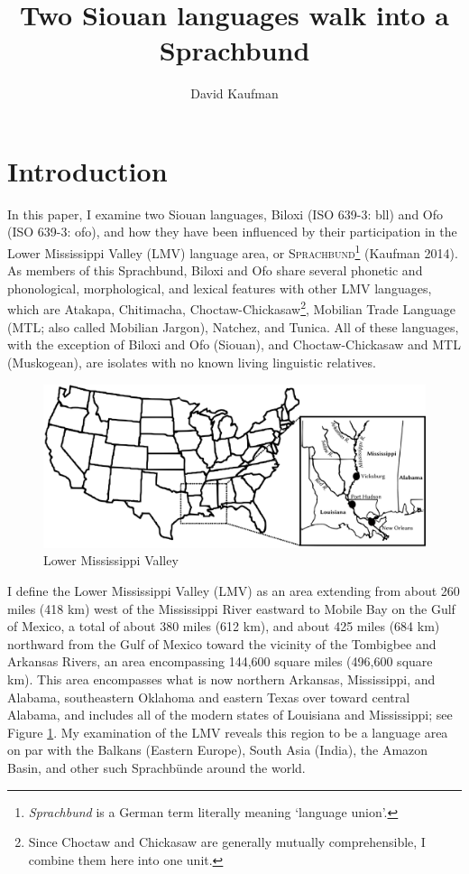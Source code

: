 \documentclass[output=paper]{LSP/langsci}
\author{David Kaufman}
\title{Two Siouan languages walk into a Sprachbund}
\begin{document}
\section{Introduction}
In this paper, I examine two Siouan languages, Biloxi (ISO 639-3: bll) and Ofo (ISO 639-3: ofo), and how they have been influenced by their participation in the Lower Mississippi Valley (LMV) language area, or \textsc{Sprachbund}\footnote{\emph{Sprachbund} is a German term literally meaning `language union'.} (Kaufman 2014). As members of this Sprachbund, Biloxi and Ofo share several phonetic and phonological, morphological, and lexical features with other LMV languages, which are Atakapa, Chitimacha, Choctaw-Chickasaw\footnote{Since Choctaw and Chickasaw are generally mutually comprehensible, I combine them here into one unit.}, Mobilian Trade Language (MTL; also called Mobilian Jargon), Natchez, and Tunica. All of these languages, with the exception of Biloxi and Ofo (Siouan), and Choctaw-Chickasaw and MTL (Muskogean), are isolates with no known living linguistic relatives. 

\begin{figure}
\caption{Lower Mississippi Valley} \label{map}
\includegraphics[width=12cm]{figures/Kaufman1}
\end{figure}

I define the Lower Mississippi Valley (LMV) as an area extending from about 260 miles (418 km) west of the Mississippi River eastward to Mobile Bay on the Gulf of Mexico, a total of about 380 miles (612 km), and about 425 miles (684 km) northward from the Gulf of Mexico toward the vicinity of the Tombigbee and Arkansas Rivers, an area encompassing 144,600 square miles (496,600 square km). This area encompasses what is now northern Arkansas, Mississippi, and Alabama, southeastern Oklahoma and eastern Texas over toward central Alabama, and includes all of the modern states of Louisiana and Mississippi; see Figure \ref{map}. My examination of the LMV reveals this region to be a language area on par with the Balkans (Eastern Europe), South Asia (India), the Amazon Basin, and other such Sprachbünde around the world.
\end{document}
